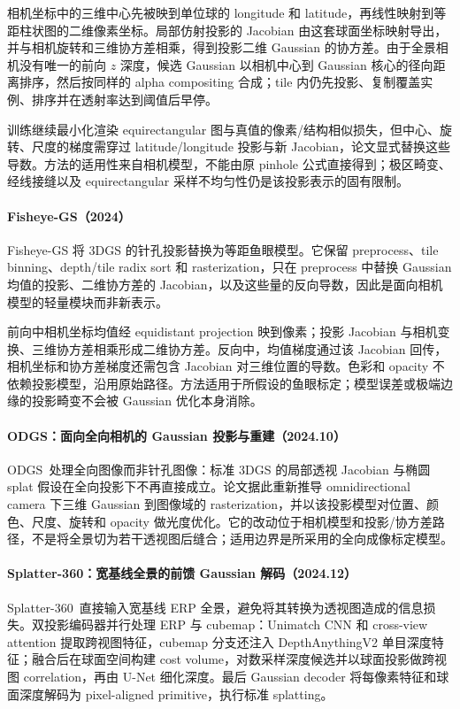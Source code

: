 相机坐标中的三维中心先被映到单位球的 longitude 和 latitude，再线性映射到等距柱状图的二维像素坐标。局部仿射投影的 Jacobian 由这套球面坐标映射导出，并与相机旋转和三维协方差相乘，得到投影二维 Gaussian 的协方差。由于全景相机没有唯一的前向 $z$ 深度，候选 Gaussian 以相机中心到 Gaussian 核心的径向距离排序，然后按同样的 alpha compositing 合成；tile 内仍先投影、复制覆盖实例、排序并在透射率达到阈值后早停。

训练继续最小化渲染 equirectangular 图与真值的像素/结构相似损失，但中心、旋转、尺度的梯度需穿过 latitude/longitude 投影与新 Jacobian，论文显式替换这些导数。方法的适用性来自相机模型，不能由原 pinhole 公式直接得到；极区畸变、经线接缝以及 equirectangular 采样不均匀性仍是该投影表示的固有限制。

\paragraph{Fisheye-GS（2024）\cite{2409_04751}}
Fisheye-GS 将 3DGS 的针孔投影替换为等距鱼眼模型。它保留 preprocess、tile binning、depth/tile radix sort 和 rasterization，只在 preprocess 中替换 Gaussian 均值的投影、二维协方差的 Jacobian，以及这些量的反向导数，因此是面向相机模型的轻量模块而非新表示。

前向中相机坐标均值经 equidistant projection 映到像素；投影 Jacobian 与相机变换、三维协方差相乘形成二维协方差。反向中，均值梯度通过该 Jacobian 回传，相机坐标和协方差梯度还需包含 Jacobian 对三维位置的导数。色彩和 opacity 不依赖投影模型，沿用原始路径。方法适用于所假设的鱼眼标定；模型误差或极端边缘的投影畸变不会被 Gaussian 优化本身消除。

\paragraph{ODGS：面向全向相机的 Gaussian 投影与重建（2024.10）}
ODGS~\cite{2410_20686}处理全向图像而非针孔图像：标准 3DGS 的局部透视 Jacobian 与椭圆 splat 假设在全向投影下不再直接成立。论文据此重新推导 omnidirectional camera 下三维 Gaussian 到图像域的 rasterization，并以该投影模型对位置、颜色、尺度、旋转和 opacity 做光度优化。它的改动位于相机模型和投影/协方差路径，不是将全景切为若干透视图后缝合；适用边界是所采用的全向成像标定模型。


\paragraph{Splatter-360：宽基线全景的前馈 Gaussian 解码（2024.12）}
Splatter-360~\cite{2412_06250}直接输入宽基线 ERP 全景，避免将其转换为透视图造成的信息损失。双投影编码器并行处理 ERP 与 cubemap：Unimatch CNN 和 cross-view attention 提取跨视图特征，cubemap 分支还注入 DepthAnythingV2 单目深度特征；融合后在球面空间构建 cost volume，对数采样深度候选并以球面投影做跨视图 correlation，再由 U-Net 细化深度。最后 Gaussian decoder 将每像素特征和球面深度解码为 pixel-aligned primitive，执行标准 splatting。

